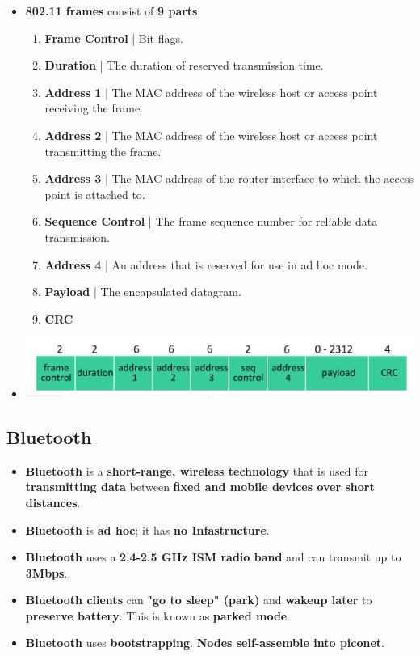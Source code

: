 \documentclass{article}
\begin{document}
\begin{itemize}
        \item \textbf{802.11 frames} consist of \textbf{9 parts}:
        \begin{enumerate}
            \item \textbf{Frame Control} | Bit flags.
            \item \textbf{Duration} | The duration of reserved transmission time.
            \item \textbf{Address 1} | The MAC address of the wireless host or access point receiving the frame.
            \item \textbf{Address 2} | The MAC address of the wireless host or access point transmitting the frame.
            \item \textbf{Address 3} | The MAC address of the router interface to which the access point is attached to.
            \item \textbf{Sequence Control} | The frame sequence number for reliable data transmission.
            \item \textbf{Address 4} | An address that is reserved for use in ad hoc mode.
            \item \textbf{Payload} | The encapsulated datagram.
            \item \textbf{CRC}
        \end{enumerate}
        \item[] \includegraphics[width=\textwidth - 25pt]{images/WiFi-Frame.png} 
    \end{itemize}

    \subsection*{Bluetooth}
    \begin{itemize}
        \item \textbf{Bluetooth} is a \textbf{short-range, wireless technology} that is used for \textbf{transmitting data} between \textbf{fixed and mobile devices over short distances}.
        \item \textbf{Bluetooth} is \textbf{ad hoc}; it has \textbf{no Infastructure}.
        \item \textbf{Bluetooth} uses a \textbf{2.4-2.5 GHz ISM radio band} and can transmit up to \textbf{3Mbps}.
        \item \textbf{Bluetooth clients} can \textbf{"go to sleep" (park)} and \textbf{wakeup later} to \textbf{preserve battery}. This is known as \textbf{parked mode}.
        \item \textbf{Bluetooth} uses \textbf{bootstrapping}. \textbf{Nodes self-assemble into piconet}.
    \end{itemize}
\end{document}

